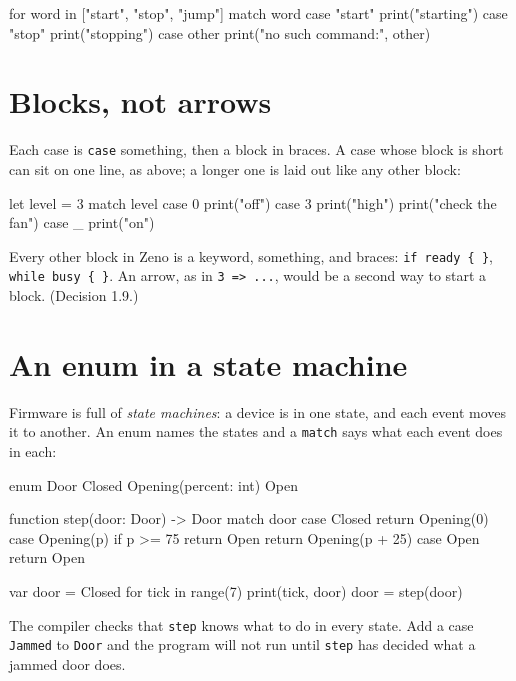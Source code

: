 \begin{zeno}
for word in ["start", "stop", "jump"] {
    match word {
        case "start" { print("starting") }
        case "stop" { print("stopping") }
        case other { print("no such command:", other) }
    }
}
\end{zeno}

\section{Blocks, not arrows}

Each case is \verb|case| something, then a block in braces. A case
whose block is short can sit on one line, as above; a longer one is
laid out like any other block:

\begin{zeno}
let level = 3
match level {
    case 0 { print("off") }
    case 3 {
        print("high")
        print("check the fan")
    }
    case _ { print("on") }
}
\end{zeno}

\begin{why}
Every other block in Zeno is a keyword, something, and braces:
\verb|if ready { }|, \verb|while busy { }|. An arrow, as in
\verb|3 => ...|, would be a second way to start a block. (Decision 1.9.)
\end{why}

\section{An enum in a state machine}

Firmware is full of \emph{state machines}: a device is in one state,
and each event moves it to another. An enum names the states and a
\verb|match| says what each event does in each:

\begin{zeno}[file=door.zeno]
enum Door {
    Closed
    Opening(percent: int)
    Open
}

function step(door: Door) -> Door {
    match door {
        case Closed { return Opening(0) }
        case Opening(p) {
            if p >= 75 {
                return Open
            }
            return Opening(p + 25)
        }
        case Open { return Open }
    }
}

var door = Closed
for tick in range(7) {
    print(tick, door)
    door = step(door)
}
\end{zeno}

The compiler checks that \verb|step| knows what to do in every state.
Add a case \verb|Jammed| to \verb|Door| and the program will not run
until \verb|step| has decided what a jammed door does.

